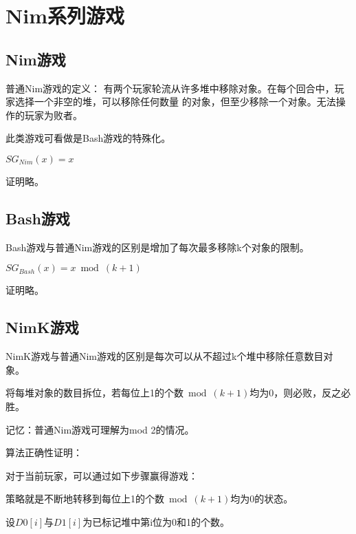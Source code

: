 \section{Nim系列游戏}

\subsection{Nim游戏}


普通Nim游戏的定义：
有两个玩家轮流从许多堆中移除对象。在每个回合中，玩家选择一个非空的堆，可以移除任何数量
的对象，但至少移除一个对象。无法操作的玩家为败者。

此类游戏可看做是Bash游戏的特殊化。

\begin{theorem}
	$SG_{Nim}(x)=x$
\end{theorem}

证明略。

\subsection{Bash游戏}


Bash游戏与普通Nim游戏的区别是增加了每次最多移除k个对象的限制。

\begin{theorem}
	$SG_{Bash}(x)=x \bmod (k+1)$
\end{theorem}

证明略。

\subsection{NimK游戏}


NimK游戏与普通Nim游戏的区别是每次可以从不超过k个堆中移除任意数目对象。

\begin{theorem}\label{NimK}
	将每堆对象的数目拆位，若每位上1的个数$\bmod (k+1)$均为0，则必败，反之必胜。
\end{theorem}

记忆：普通Nim游戏可理解为mod 2的情况。

算法正确性证明：

对于当前玩家，可以通过如下步骤赢得游戏：

策略就是不断地转移到每位上1的个数$\bmod (k+1)$均为0的状态。

设$D0[i]$与$D1[i]$为已标记堆中第i位为0和1的个数。

